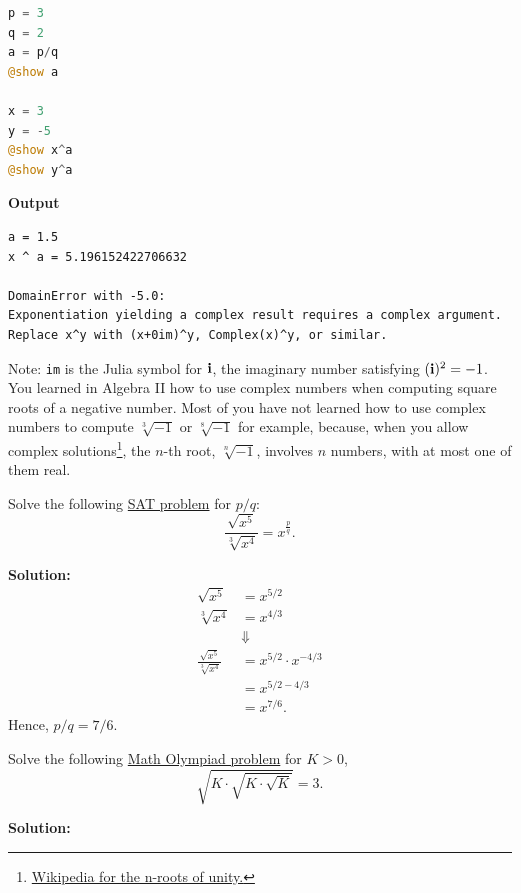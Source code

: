 \begin{lstlisting}[language=Julia,style=mystyle]
p = 3
q = 2
a = p/q
@show a

x = 3
y = -5
@show x^a
@show y^a 
\end{lstlisting}
\textbf{Output} 
\begin{verbatim}
a = 1.5
x ^ a = 5.196152422706632

DomainError with -5.0:
Exponentiation yielding a complex result requires a complex argument.
Replace x^y with (x+0im)^y, Complex(x)^y, or similar.

\end{verbatim}
Note: \texttt{im} is the Julia symbol for $\mathop{\bm{\mathrm i}}$, the imaginary number satisfying $(\mathop{\bm{\mathrm i}})^2 = -1$. You learned in Algebra II how to use complex numbers when computing square roots of a negative number. Most of you have not learned how to use complex numbers to compute $\sqrt[3]{-1}$ or $\sqrt[8]{-1}$ for example, because, when you allow complex solutions\footnote{\href{https://en.wikipedia.org/wiki/Root_of_unity}{Wikipedia for the n-roots of unity.}}, the $n$-th root, $\sqrt[n]{-1}$, involves $n$ numbers, with at most one of them real.

\bigskip

\begin{example} Solve the following \href{https://youtu.be/l5WyvXvYRzc}{SAT problem} for $p/q$:
$$ \frac{\sqrt{x^5}}{\sqrt[3]{x^4}} = x^{\frac{p}{q}}.$$    
\end{example}

\textbf{Solution:}
\begin{align*}
    \sqrt{x^5} & =x^{5/2} \\
    \sqrt[3]{x^4} & = x^{4/3} \\
    & \Downarrow \\
    \frac{\sqrt{x^5}}{\sqrt[3]{x^4}} & = x^{5/2} \cdot x^{-4/3}\\
    & = x^{5/2 - 4/3} \\
    & = x^{7/6}.
\end{align*}
Hence, $p/q=7/6$.
\Qed

\bigskip

\begin{example} Solve the following \href{https://youtu.be/wGk2HbPYnio}{Math Olympiad problem} for $K>0$,
$$ \sqrt{K \cdot \sqrt{K \cdot \sqrt{K} } }=3.$$    
\end{example}

\textbf{Solution:}

